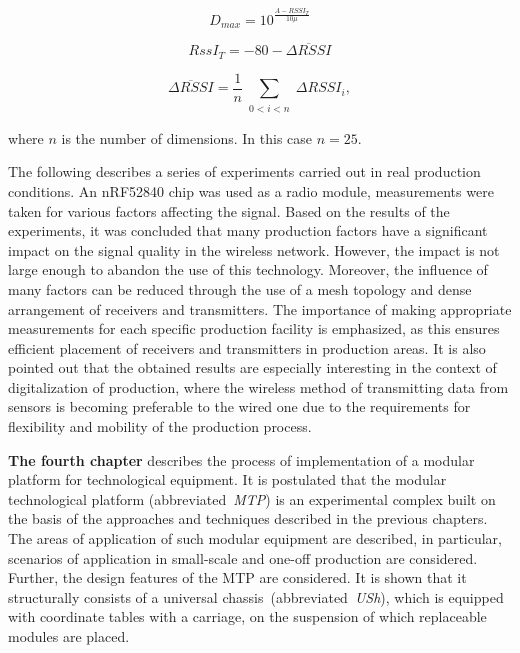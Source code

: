 \begin{equation}
D_{max} = 10 ^ \frac{A-RSSI_T}{10 \mu}
\label{eq-5}
\end{equation}

\begin{equation}
RssI_T = -80- \overline{{\mathit \Delta} RSSI}
\label{eq-6}
\end{equation}

\begin{equation}
\overline{{\mathit \Delta} RSSI} = \frac1n \sum _{\substack{0 <i <n}}{\mathit \Delta} RSSI_i,
\label{eq-7}
\end{equation}

\noindent where $n$ is the number of dimensions. In this case $n = 25$.

The following describes a series of experiments carried out in real production conditions. An nRF52840 chip was used as a radio module, measurements were taken for various factors affecting the signal. Based on the results of the experiments, it was concluded that many production factors have a significant impact on the signal quality in the wireless network. However, the impact is not large enough to abandon the use of this technology. Moreover, the influence of many factors can be reduced through the use of a mesh topology and dense arrangement of receivers and transmitters. The importance of making appropriate measurements for each specific production facility is emphasized, as this ensures efficient placement of receivers and transmitters in production areas. It is also pointed out that the obtained results are especially interesting in the context of digitalization of production, where the wireless method of transmitting data from sensors is becoming preferable to the wired one due to the requirements for flexibility and mobility of the production process.


\textbf{The fourth chapter} describes the process of implementation of a modular platform for technological equipment. It is postulated that the modular technological platform (abbreviated~\textit{MTP}) is an experimental complex built on the basis of the approaches and techniques described in the previous chapters. The areas of application of such modular equipment are described, in particular, scenarios of application in small-scale and one-off production are considered. Further, the design features of the MTP are considered. It is shown that it structurally consists of a universal chassis~(abbreviated~\textit{USh}), which is equipped with coordinate tables with a carriage, on the suspension of which replaceable modules are placed.

